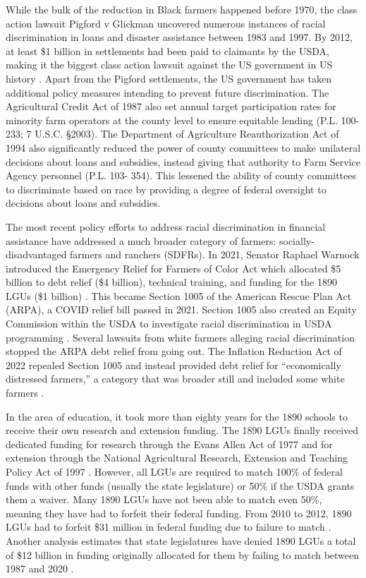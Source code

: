 \documentclass[12pt]{article}
\begin{document}
While the bulk of the reduction in Black farmers happened before 1970, the class action lawsuit Pigford v Glickman uncovered numerous instances of racial discrimination in loans and disaster assistance between 1983 and 1997. 
By 2012, at least \$1 billion in settlements had been paid to claimants by the USDA, making it the biggest class action lawsuit against the US government in US history \citep{cowan_pigford_2013}. 
Apart from the Pigford settlements, the US government has taken additional policy measures intending to prevent future discrimination.
The Agricultural Credit Act of 1987 also set annual target participation rates for minority farm operators at the county level to ensure equitable lending (P.L. 100-233; 7 U.S.C. §2003). 
The Department of Agriculture Reauthorization Act of 1994 also significantly reduced the power of county committees to make unilateral decisions about loans and subsidies, instead giving that authority to Farm Service Agency personnel (P.L. 103- 354). 
This lessened the ability of county committees to discriminate based on race by providing a degree of federal oversight to decisions about loans and subsidies. 

The most recent policy efforts to address racial discrimination in financial assistance have addressed a much broader category of farmers: socially-disadvantaged farmers and ranchers (SDFRs).
In 2021, Senator Raphael Warnock introduced the Emergency Relief for Farmers of Color Act which allocated \$5 billion to debt relief (\$4 billion), technical training, and funding for the 1890 LGUs (\$1 billion) \citep{warncock_relief_2023}. 
This became Section 1005 of the American Rescue Plan Act (ARPA), a COVID relief bill passed in 2021. 
Section 1005 also created an Equity Commission within the USDA to investigate racial discrimination in USDA programming \citep{yarmuth_american_2021}. 
Several lawsuits from white farmers alleging racial discrimination stopped the ARPA debt relief from going out. 
The Inflation Reduction Act of 2022 repealed Section 1005 and instead provided debt relief for “economically distressed farmers,” a category that was broader still and included some white farmers \citep{bustillo_black_2023}. 

In the area of education, it took more than eighty years for the 1890 schools to receive their own research and extension funding. 
The 1890 LGUs finally received dedicated funding for research through the Evans Allen Act of 1977 and for extension through the National Agricultural Research, Extension and Teaching Policy Act of 1997 \citep{tegene_investing_2002}. 
However, all LGUs are required to match 100\% of federal funds with other funds (usually the state legislature) or 50\% if the USDA grants them a waiver. 
Many 1890 LGUs have not been able to match even 50\%, meaning they have had to forfeit their federal funding. 
From 2010 to 2012, 1890 LGUs had to forfeit \$31 million in federal funding due to failure to match \citep{lee_land-grant_2013}. 
Another analysis estimates that state legislatures have denied 1890 LGUs a total of \$12 billion in funding originally allocated for them by failing to match between 1987 and 2020 \citep{adams_how_2022}. 
\end{document}
